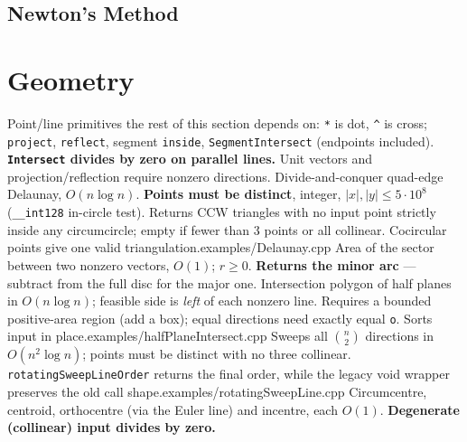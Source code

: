 \subsection{Newton's Method}



\section{Geometry}
%
{Point/line primitives the rest of this section depends on: \texttt{*} is dot, \texttt{\^} is cross; \texttt{project}, \texttt{reflect}, segment \texttt{inside}, \texttt{SegmentIntersect} (endpoints included). \textbf{\texttt{Intersect} divides by zero on parallel lines.} Unit vectors and projection/reflection require nonzero directions.}
%
{Divide-and-conquer quad-edge Delaunay, $O(n\log n)$. \textbf{Points must be distinct}, integer, $|x|,|y|\le5\cdot10^8$ (\texttt{\_\_int128} in-circle test). Returns CCW triangles with no input point strictly inside any circumcircle; empty if fewer than 3 points or all collinear. Cocircular points give one valid triangulation.}{examples/Delaunay.cpp}
%
{Area of the sector between two nonzero vectors, $O(1)$; $r\ge0$. \textbf{Returns the minor arc} --- subtract from the full disc for the major one.}
%
{Intersection polygon of half planes in $O(n\log n)$; feasible side is \emph{left} of each nonzero line. Requires a bounded positive-area region (add a box); equal directions need exactly equal \texttt{o}. Sorts input in place.}{examples/halfPlaneIntersect.cpp}
%
{Sweeps all $\binom n2$ directions in $O(n^2\log n)$; points must be distinct with no three collinear. \texttt{rotatingSweepLineOrder} returns the final order, while the legacy void wrapper preserves the old call shape.}{examples/rotatingSweepLine.cpp}
%
{Circumcentre, centroid, orthocentre (via the Euler line) and incentre, each $O(1)$. \textbf{Degenerate (collinear) input divides by zero.}}
%

